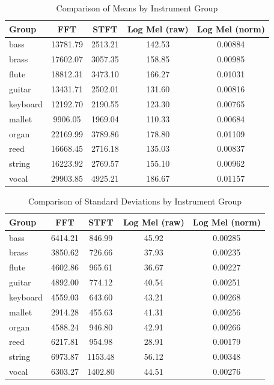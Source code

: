 \documentclass[sigconf,natbib=false]{acmart}
\begin{document}
\begin{table}
  \caption{Comparison of Means by Instrument Group}
  \label{tab:means_by_group}
  \begin{tabular}{lcccc}
    \toprule
    Group & FFT & STFT & Log Mel (raw) & Log Mel (norm) \\
    \midrule
    bass     & 13781.79 & 2513.21 & 142.53 & 0.00884 \\
    brass    & 17602.07 & 3057.35 & 158.85 & 0.00985 \\
    flute    & 18812.31 & 3473.10 & 166.27 & 0.01031 \\
    guitar   & 13431.71 & 2502.01 & 131.60 & 0.00816 \\
    keyboard & 12192.70 & 2190.55 & 123.30 & 0.00765 \\
    mallet   & 9906.05  & 1969.04 & 110.33 & 0.00684 \\
    organ    & 22169.99 & 3789.86 & 178.80 & 0.01109 \\
    reed     & 16668.45 & 2716.18 & 135.03 & 0.00837 \\
    string   & 16223.92 & 2769.57 & 155.10 & 0.00962 \\
    vocal    & 29903.85 & 4925.21 & 186.67 & 0.01157 \\
    \bottomrule
  \end{tabular}
\end{table}

\begin{table}
  \caption{Comparison of Standard Deviations by Instrument Group}
  \label{tab:std_by_group}
  \begin{tabular}{lcccc}
    \toprule
    Group & FFT & STFT & Log Mel (raw) & Log Mel (norm) \\
    \midrule
    bass     & 6414.21 & 846.99  & 45.92 & 0.00285 \\
    brass    & 3850.62 & 726.66  & 37.93 & 0.00235 \\
    flute    & 4602.86 & 965.61  & 36.67 & 0.00227 \\
    guitar   & 4892.00 & 774.12  & 40.54 & 0.00251 \\
    keyboard & 4559.03 & 643.60  & 43.21 & 0.00268 \\
    mallet   & 2914.28 & 455.63  & 41.31 & 0.00256 \\
    organ    & 4588.24 & 946.80  & 42.91 & 0.00266 \\
    reed     & 6217.81 & 954.98  & 28.91 & 0.00179 \\
    string   & 6973.87 & 1153.48 & 56.12 & 0.00348 \\
    vocal    & 6303.27 & 1402.80 & 44.51 & 0.00276 \\
    \bottomrule
  \end{tabular}
\end{table}
\end{document}
